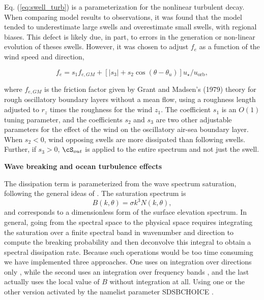 Eq. (\ref{eq:swell_turb}) is a parameterization for the
nonlinear turbulent decay. When comparing model results to observations, it
was found that the model tended to underestimate large swells and overestimate
small swells, with regional biases. This defect is likely due, in part, to
errors in the generation or non-linear evolution of theses swells. However, it
was chosen to adjust $f_e$ as a function of the wind speed and direction,

\begin{equation}
f_e = s_1 f_{e,GM} + \left[\left|s_3\right| + s_2 \cos
(\theta-\theta_u)\right]u_\star / u_{\mathrm{orb}},\label{fevar}
\end{equation}

\noindent 
where $f_{e,GM}$ is the friction factor given by Grant and Madsen's
(1979)\nocite{art:GM79} theory for rough oscillatory boundary layers without a
mean flow, using a roughness length adjusted to $r_z$ times the roughness for
the wind $z_1$. The coefficient $s_1$ is an $O(1)$ tuning parameter, and the
coefficients $s_2$ and $s_3$ are two other adjustable parameters for the
effect of the wind on the oscillatory air-sea boundary layer. When $s_2 < 0$,
wind opposing swells are more dissipated than following swells. Further, if
$s_3 > 0$, $\cS_{out}$ is applied to the entire spectrum and not just the
swell.


\vsssub
\textbf{Wave breaking and ocean turbulence effects} 
\vsssub


The dissipation term is parameterized from the wave spectrum saturation, following the general ideas of \cite{art:Phi85}.
The saturation spectrum is 
\begin{equation}
B\left(k,\theta\right)= \sigma k^3  N(k,\theta) \label{defB},
\end{equation}
and corresponds to a dimensionless form of the surface elevation spectrum. In general, going from the spectral space to the physical space requires 
integrating the saturation over a finite spectral band in wavenumber and direction to compute the breaking probability 
and then deconvolve this integral to obtain a spectral dissipation rate. Because such operations would be too time consuming we have 
implemented three approaches. One uses on integration over directions only \citep{art:Aea10}, while the second uses an integration  over frequency 
bands \citep{Filipot&Ardhuin2012}, and the last actually uses the local value of $B$ without integration at all. Using one or the other version activated by the namelist parameter {\F  SDSBCHOICE  }.

